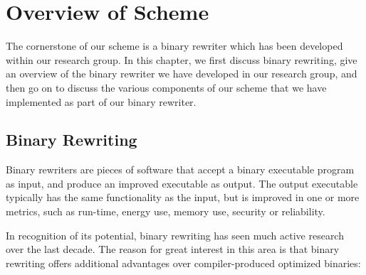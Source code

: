 
\renewcommand{\thechapter}{3}

\chapter{Overview of Scheme}

The cornerstone of our scheme is a binary rewriter which has been developed within our research
group. In this chapter, we first discuss binary rewriting, give an overview of the binary rewriter
we have developed in our research group, and then go on to discuss the various components of our
scheme that we have implemented as part of our binary rewriter.

\section{Binary Rewriting}

Binary rewriters are pieces of software that accept a binary executable program as input, and
produce an improved executable as output. The output executable typically has the same functionality
as the input, but is improved in one or more metrics, such as run-time, energy use, memory use,
security or reliability. 

In recognition of its potential, binary rewriting has seen much active research over the last
decade. The reason for great interest in this area is that binary rewriting offers additional
advantages over compiler-produced optimized binaries:


